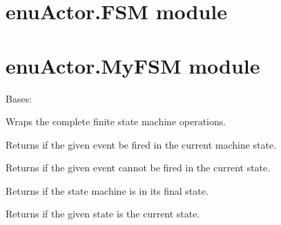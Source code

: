 \documentclass[letterpaper,10pt,english]{sphinxmanual}
\begin{document}
\section{enuActor.FSM module}
\label{enuActor:enuactor-fsm-module}

\section{enuActor.MyFSM module}
\label{enuActor:module-enuActor.MyFSM}\label{enuActor:enuactor-myfsm-module}

\begin{fulllineitems}
\label{enuActor:enuActor.MyFSM.Fysom}
Bases: 

Wraps the complete finite state machine operations.

\begin{fulllineitems}
\label{enuActor:enuActor.MyFSM.Fysom.can}
Returns if the given event be fired in the current machine state.

\end{fulllineitems}


\begin{fulllineitems}
\label{enuActor:enuActor.MyFSM.Fysom.cannot}
Returns if the given event cannot be fired in the current state.

\end{fulllineitems}


\begin{fulllineitems}
\label{enuActor:enuActor.MyFSM.Fysom.is_finished}
Returns if the state machine is in its final state.

\end{fulllineitems}


\begin{fulllineitems}
\label{enuActor:enuActor.MyFSM.Fysom.isstate}
Returns if the given state is the current state.


\end{fulllineitems}
\end{fulllineitems}
\end{document}
